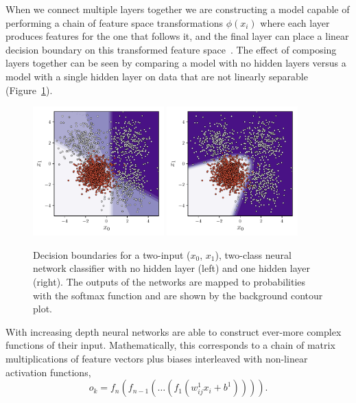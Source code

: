 When we connect multiple layers together we are constructing a model capable of performing a chain of feature space transformations $\phi(x_{i})$ where each layer produces features for the one that follows it, and the final layer can place a linear decision boundary on this transformed feature space~\cite{DeepLearningBook}. 
The effect of composing layers together can be seen by comparing a model with no hidden layers versus a model with a single hidden layer on data that are not linearly separable (Figure~\ref{fig:machine_learning:mlp_example}).

\begin{figure}[h!]
    \begin{center}
        \includegraphics[width=0.45\textwidth]{figures/machine_learning/decision_bound_tanh_depth_1.pdf}
        \includegraphics[width=0.45\textwidth]{figures/machine_learning/decision_bound_tanh_depth_2.pdf}
    \end{center}
    \caption{Decision boundaries for a two-input ($x_{0}$, $x_{1}$), two-class neural network classifier with no hidden layer (left) and one hidden layer (right). The outputs of the networks are mapped to probabilities with the softmax function and are shown by the background contour plot. }
        \label{fig:machine_learning:mlp_example}
\end{figure}
With increasing depth neural networks are able to construct ever-more complex functions of their input. 
Mathematically, this corresponds to a chain of matrix multiplications of feature vectors plus biases interleaved with non-linear activation functions,
\begin{equation}
    o_{k} = f_{n}(f_{n-1}(\dots{}(f_{1}(w^{1}_{ij}x_{i} + b^{1})))).
\end{equation}



